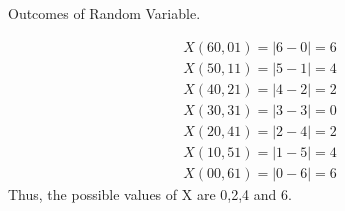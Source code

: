 \documentclass{article}
\begin{document}
\begin{enumerate}[label=13.\arabic{enumi}.\arabic{enumii}]
	\begin{table}[h]
	\centering
	
	\caption{Outcomes of Random Variable.}
	\label{tables:13.4.3.2}
	\end{table}
	
\begin{align}
X(60,01) = |6-0| = 6\\
X(50,11) = |5-1| = 4\\
X(40,21) = |4-2| = 2\\
X(30,31) = |3-3| = 0\\
X(20,41) = |2-4| = 2\\
X(10,51) = |1-5| = 4\\
X(00,61) = |0-6| = 6
\end{align}
Thus, the possible values of X are 0,2,4 and 6.
\end{enumerate}
\end{document}
